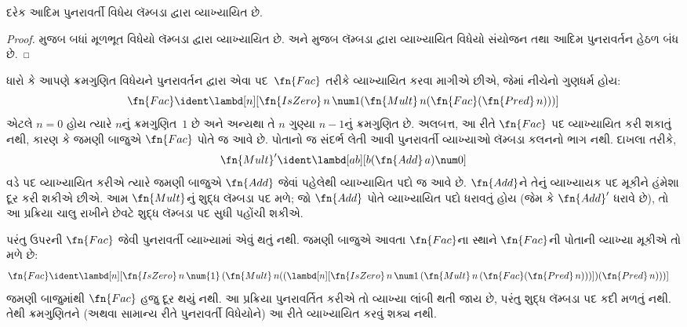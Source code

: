 \begin{prop}
  દરેક આદિમ પુનરાવર્તી વિધેય લૅમ્બડા દ્વારા વ્યાખ્યાયિત છે.
\end{prop}

\begin{proof}
   મુજબ બધાં મૂળભૂત વિધેયો
  લૅમ્બડા દ્વારા વ્યાખ્યાયિત છે. 
  અને  મુજબ
  લૅમ્બડા દ્વારા વ્યાખ્યાયિત વિધેયો સંયોજન તથા
  આદિમ પુનરાવર્તન હેઠળ બંધ છે.
\end{proof}
\endgroup

\begingroup
\makeatletter{}\makeatother


\label{guunit:OLP-0379}


ધારો કે આપણે ક્રમગુણિત વિધેયને પુનરાવર્તન દ્વારા એવા
પદ~$\fn{Fac}$ તરીકે વ્યાખ્યાયિત કરવા માગીએ છીએ, જેમાં નીચેનો ગુણધર્મ હોય:
\[
\fn{Fac} \ident \lambd[n][\fn{IsZero}\, n\, \num 1 (\fn{Mult}\, n (\fn{Fac}(\fn{Pred} \, n)))]
\]
એટલે $n=0$ હોય ત્યારે $n$નું ક્રમગુણિત~$1$ છે અને
અન્યથા તે $n$ ગુણ્યા $n-1$નું ક્રમગુણિત છે. અલબત્ત, આ રીતે
$\fn{Fac}$ પદ વ્યાખ્યાયિત કરી શકાતું નથી, કારણ કે જમણી બાજુએ
$\fn{Fac}$ પોતે જ આવે છે. પોતાનો જ સંદર્ભ લેતી આવી
પુનરાવર્તી વ્યાખ્યાઓ લૅમ્બડા કલનનો ભાગ નથી. દાખલા તરીકે,
\[
\fn{Mult}' \ident \lambd[ab][b (\fn{Add}\, a) \num0]
\]
વડે પદ વ્યાખ્યાયિત કરીએ ત્યારે જમણી બાજુએ $\fn{Add}$ જેવાં
પહેલેથી વ્યાખ્યાયિત પદો જ આવે છે. $\fn{Add}$ને તેનું વ્યાખ્યાયક
પદ મૂકીને હંમેશા દૂર કરી શકીએ છીએ. આમ $\fn{Mult}$નું
શુદ્ધ લૅમ્બડા પદ મળે; જો $\fn{Add}$ પોતે વ્યાખ્યાયિત પદો
ધરાવતું હોય (જેમ કે $\fn{Add}'$ ધરાવે છે), તો આ પ્રક્રિયા
ચાલુ રાખીને છેવટે શુદ્ધ લૅમ્બડા પદ સુધી પહોંચી શકીએ.

પરંતુ ઉપરની $\fn{Fac}$ જેવી પુનરાવર્તી વ્યાખ્યામાં એવું થતું
નથી. જમણી બાજુએ આવતા $\fn{Fac}$ના સ્થાને
$\fn{Fac}$ની પોતાની વ્યાખ્યા મૂકીએ તો મળે છે:
\begin{align*}
  \fn{Fac} & \ident \lambd[n][\fn{IsZero}\, n\, \num{1}\,
    (\fn{Mult}\, n
  ((\lambd[n][\fn{IsZero} \, n \, \num 1\, (\fn{Mult}\, n\, (\fn{Fac}
    (\fn{Pred}\, n)))]) (\fn{Pred}\, n)))]
\end{align*}
જમણી બાજુમાંથી $\fn{Fac}$ હજુ દૂર થયું નથી. આ પ્રક્રિયા
પુનરાવર્તિત કરીએ તો વ્યાખ્યા લાંબી થતી જાય છે, પરંતુ
શુદ્ધ લૅમ્બડા પદ કદી મળતું નથી. તેથી ક્રમગુણિતને
(અથવા સામાન્ય રીતે પુનરાવર્તી વિધેયોને) આ રીતે વ્યાખ્યાયિત
કરવું શક્ય નથી.

